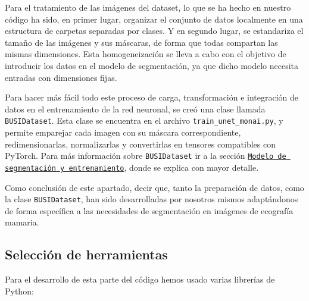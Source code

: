 \documentclass[12pt]{article}
\begin{document}
Para el tratamiento de las imágenes del dataset, lo que se ha hecho en nuestro código ha sido, en primer lugar, organizar el conjunto de datos localmente en una estructura de carpetas separadas por clases. Y en segundo lugar, se estandariza el tamaño de las imágenes y sus máscaras, de forma que todas compartan las mismas dimensiones. Esta homogeneización se lleva a cabo con el objetivo de introducir los datos en el modelo de segmentación, ya que dicho modelo necesita entradas con dimensiones fijas.

Para hacer más fácil todo este proceso de carga, transformación e integración de datos en el entrenamiento de la red neuronal, se creó una clase llamada \texttt{BUSIDataset}. Esta clase se encuentra en el archivo \texttt{train\_unet\_monai.py}, y permite emparejar cada imagen con su máscara correspondiente, redimensionarlas, normalizarlas y convertirlas en tensores compatibles con PyTorch. Para más información sobre \texttt{BUSIDataset} ir a la sección \hyperref[sec:entrenamiento]{\texttt{Modelo de segmentación y entrenamiento}}, donde se explica con mayor detalle.

Como conclusión de este apartado, decir que, tanto la preparación de datos, como la clase \texttt{BUSIDataset}, han sido desarrolladas por nosotros mismos adaptándonos de forma específica a las necesidades de segmentación en imágenes de ecografía mamaria.

\subsection{Selección de herramientas}

Para el desarrollo de esta parte del código hemos usado varias librerías de Python:
\end{document}
